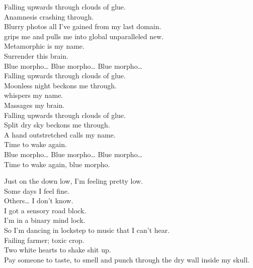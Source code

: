


Falling upwards through clouds of glue. \\
Anamnesis crashing through. \\
Blurry photos all I've gained from my last domain. \\

 grips me and pulls me into global unparalleled new. \\
Metamorphic is my name. \\
Surrender this brain. \\

Blue morpho… Blue morpho… Blue morpho… \\

Falling upwards through clouds of glue. \\
Moonless night beckons me through. \\
 whispers my name. \\
Massages my brain. \\

Falling upwards through clouds of glue. \\
Split dry sky beckons me through. \\
A hand outstretched calls my name. \\
Time to wake again. \\

Blue morpho… Blue morpho… Blue morpho… \\

Time to wake again, blue morpho. \\




Just on the down low, I'm feeling pretty low. \\
Some days I feel fine. \\
Others… I don't know. \\
I got a sensory road block. \\
I'm in a binary mind lock. \\
So I'm dancing in lockstep to music that I can't hear. \\

Failing farmer; toxic crop. \\
Two white hearts to shake shit up. \\
Pay someone to taste, to smell and punch through the dry wall inside my skull. \\

